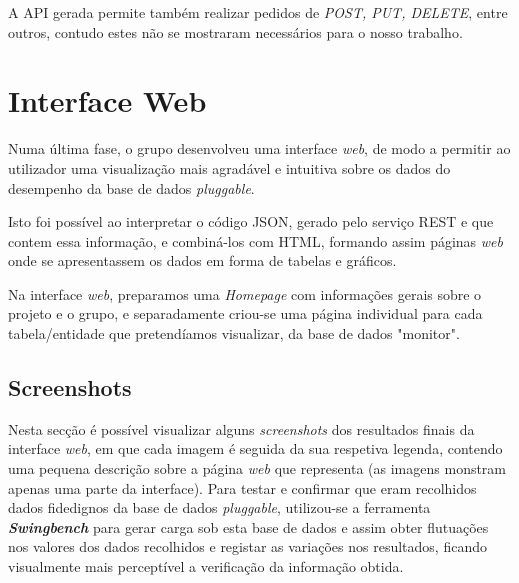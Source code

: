 \documentclass[a4paper]{article}
\begin{document}
A API gerada permite também realizar pedidos de \emph{POST, PUT, DELETE}, entre outros, contudo estes não se mostraram necessários para o nosso trabalho.


\section{Interface Web}
\hspace{3mm} 

Numa última fase, o grupo desenvolveu uma interface \emph{web}, de modo a permitir ao utilizador uma visualização mais agradável e intuitiva sobre os dados do desempenho da base de dados \emph{pluggable}.

Isto foi possível ao interpretar o código JSON, gerado pelo serviço REST e que contem essa informação, e combiná-los com HTML, formando assim páginas \emph{web} onde se apresentassem os dados em forma de tabelas e gráficos.

Na interface \emph{web}, preparamos uma \emph{Homepage} com informações gerais sobre o projeto e o grupo, e separadamente criou-se uma página individual para cada tabela/entidade que pretendíamos visualizar, da base de dados "monitor".

\newpage

\subsection{Screenshots}
\hspace{3mm} 

Nesta secção é possível visualizar alguns \emph{screenshots} dos resultados finais da interface \emph{web}, em que cada imagem é seguida da sua respetiva legenda, contendo uma pequena descrição sobre a página \emph{web} que representa (as imagens monstram apenas uma parte da interface). Para testar e confirmar que eram recolhidos dados fidedignos da base de dados \emph{pluggable}, utilizou-se a ferramenta \emph{\textbf{Swingbench}} para gerar carga sob esta base de dados e assim obter flutuações nos valores dos dados recolhidos e registar as variações nos resultados, ficando visualmente mais perceptível a verificação da informação obtida.
\end{document}
